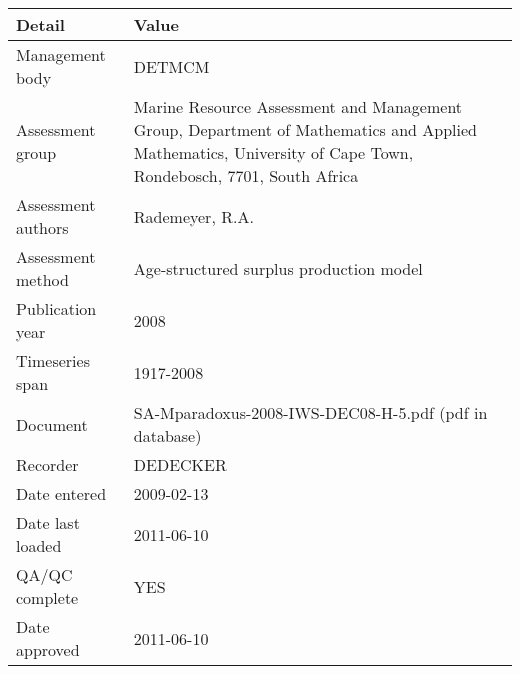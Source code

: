 \begin{table}[htb]
\centering
\begin{tabular}{lp{7cm}}
\toprule
Detail & Value \\
\midrule
Management body    & DETMCM                                                                                                                                                      \\
Assessment group   & Marine Resource Assessment and Management Group, Department of Mathematics and Applied Mathematics, University of Cape Town, Rondebosch, 7701, South Africa \\
Assessment authors & Rademeyer, R.A.                                                                                                                                             \\
Assessment method  & Age-structured surplus production model                                                                                                                     \\
Publication year   & 2008                                                                                                                                                        \\
Timeseries span    & 1917-2008                                                                                                                                                   \\
Document           & SA-Mparadoxus-2008-IWS-DEC08-H-5.pdf (pdf in database)                                                                                                      \\
Recorder           & DEDECKER                                                                                                                                                    \\
Date entered       & 2009-02-13                                                                                                                                                  \\
Date last loaded   & 2011-06-10                                                                                                                                                  \\
QA/QC complete     & YES                                                                                                                                                         \\
Date approved      & 2011-06-10                                                                                                                                                  \\
\bottomrule
\end{tabular}
\label{tab:assessdet}
\end{table}

